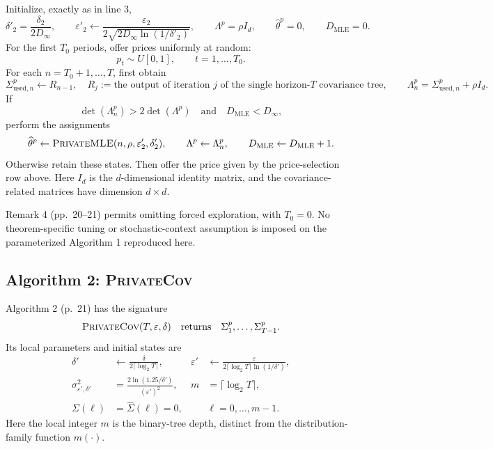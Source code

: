 \documentclass{article}
\begin{document}
Initialize, exactly as in line 3,
\[
\delta'_2=\frac{\delta_2}{2D_\infty},
\qquad
\varepsilon'_2\leftarrow
\frac{\varepsilon_2}{2\sqrt{2D_\infty\ln(1/\delta'_2)}},
\qquad
\Lambda^p=\rho I_d,
\qquad \widehat\theta^p=0,
\qquad D_{\mathrm{MLE}}=0.
\]
For the first $T_0$ periods, offer prices uniformly at random:
\[
p_t\sim U[0,1],\qquad t=1,\ldots,T_0.
\]
For each $n=T_0+1,\ldots,T$, first obtain
\[
\Sigma^p_{\mathrm{used},n}\leftarrow R_{n-1},\quad R_j:=\text{the output of iteration }j\text{ of the single horizon-}T\text{ covariance tree},
\qquad \Lambda_n^p=\Sigma^p_{\mathrm{used},n}+\rho I_d.
\]
If
\[
\det(\Lambda_n^p)>2\det(\Lambda^p)
\quad\text{and}\quad D_{\mathrm{MLE}}<D_\infty,
\]
perform the assignments
\[
\widehat\theta^p\leftarrow
\textsc{PrivateMLE}(n,\rho,\varepsilon'_2,\delta'_2),
\qquad \Lambda^p\leftarrow\Lambda_n^p,
\qquad D_{\mathrm{MLE}}\leftarrow D_{\mathrm{MLE}}+1.
\]
Otherwise retain these states. Then offer the price given by the price-selection row above. Here $I_d$ is the $d$-dimensional identity matrix, and the covariance-related matrices have dimension $d\times d$.

Remark 4 (pp.~20--21) permits omitting forced exploration, with $T_0=0$. No theorem-specific tuning or stochastic-context assumption is imposed on the parameterized Algorithm 1 reproduced here.

\subsection*{Algorithm 2: \textsc{PrivateCov}}
Algorithm 2 (p.~21) has the signature
\[
\textsc{PrivateCov}(T,\varepsilon,\delta)
\quad\text{returns}\quad\Sigma_1^p,\ldots,\Sigma_{T-1}^p.
\]
Its local parameters and initial states are
\begin{align*}
\delta'&\leftarrow\frac{\delta}{2\lceil\log_2T\rceil},
&\varepsilon'&\leftarrow
\frac{\varepsilon}{2\lceil\log_2T\rceil\ln(1/\delta')},\\
\sigma_{\varepsilon',\delta'}^2
&=\frac{2\ln(1.25/\delta')}{(\varepsilon')^2},
&m&=\lceil\log_2T\rceil,\\
\Sigma(\ell)&=\widehat\Sigma(\ell)=0,
&&\ell=0,\ldots,m-1.
\end{align*}
Here the local integer $m$ is the binary-tree depth, distinct from the distribution-family function $m(\cdot)$.
\end{document}
